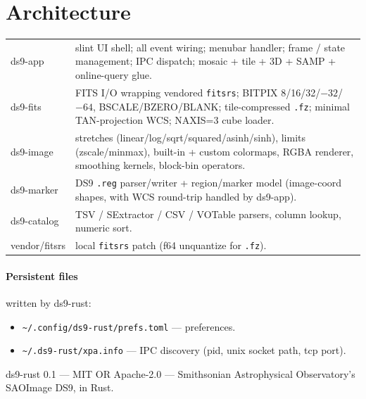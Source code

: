 \documentclass[11pt,a4paper]{article}
\begin{document}
\section{Architecture}

\begin{tabular}{@{}>{\sffamily}lp{}@{}}
\toprule
ds9-app     & slint UI shell; all event wiring; menubar handler;
              frame / state management; IPC dispatch;
              mosaic + tile + 3D + SAMP + online-query glue. \\
ds9-fits    & FITS I/O wrapping vendored \texttt{fitsrs}; BITPIX
              8/16/32/$-32$/$-64$, BSCALE/BZERO/BLANK; tile-compressed
              \texttt{.fz}; minimal TAN-projection WCS; NAXIS=3 cube
              loader. \\
ds9-image   & stretches (linear/log/sqrt/squared/asinh/sinh), limits
              (zscale/minmax), built-in + custom colormaps, RGBA
              renderer, smoothing kernels, block-bin operators. \\
ds9-marker  & DS9 \texttt{.reg} parser/writer + region/marker model
              (image-coord shapes, with WCS round-trip handled by
              ds9-app). \\
ds9-catalog & TSV / SExtractor / CSV / VOTable parsers, column lookup,
              numeric sort. \\
vendor/fitsrs & local \texttt{fitsrs} patch (f64 unquantize for
              \texttt{.fz}). \\
\bottomrule
\end{tabular}

\paragraph{Persistent files} written by ds9-rust:

\begin{itemize}
\item \texttt{\textasciitilde/.config/ds9-rust/prefs.toml} --- preferences.
\item \texttt{\textasciitilde/.ds9-rust/xpa.info} --- IPC discovery
      (pid, unix socket path, tcp port).
\end{itemize}

\vfill
\begin{center}
\sffamily\small\color{accentSoft}
ds9-rust 0.1 --- MIT OR Apache-2.0 --- Smithsonian Astrophysical
Observatory's SAOImage DS9, in Rust.
\end{center}
\end{document}
